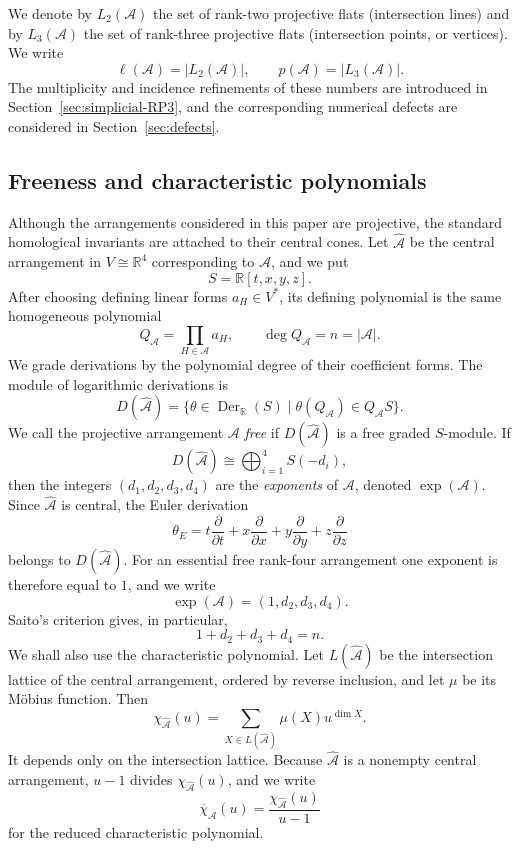 \documentclass[11pt]{article}
\theoremstyle{definition}
\theoremstyle{remark}
\newcommand{\RR}{\mathbb R}
\newcommand{\cA}{\mathcal A}
\newcommand{\card}[1]{\lvert #1\rvert}
\begin{document}
We denote by $L_2(\cA)$ the set of rank-two projective flats
(intersection lines) and by $L_3(\cA)$ the set of rank-three projective
flats (intersection points, or vertices).  We write
\[
 \ell(\cA)=\card{L_2(\cA)},
 \qquad
 p(\cA)=\card{L_3(\cA)}.
\]
The multiplicity and incidence refinements of these numbers are introduced
in Section~\ref{sec:simplicial-RP3}, and the corresponding numerical
defects are considered in Section~\ref{sec:defects}.

\subsection{Freeness and characteristic polynomials}
\label{subsec:homological}

Although the arrangements considered in this paper are projective, the
standard homological invariants are attached to their central cones.  Let
$\widehat{\cA}$ be the central arrangement in $V\cong\RR^4$ corresponding
to $\cA$, and we put
\[
 S=\RR[t,x,y,z].
\]
After choosing defining linear forms $a_H\in V^*$, its defining polynomial
is the same homogeneous polynomial
\[
 Q_{\cA}=\prod_{H\in\cA}a_H,
 \qquad \deg Q_{\cA}=n=\card{\cA}.
\]
We grade derivations by the polynomial degree of their coefficient forms.
The module of logarithmic derivations is
\[
 D(\widehat{\cA})
 =
 \bigl\{\theta\in\operatorname{Der}_{\RR}(S)
 \mid \theta(Q_{\cA})\in Q_{\cA} S\}.
\]
We call the projective arrangement $\cA$ \emph{free} if
$D(\widehat{\cA})$ is a free graded $S$-module.  If
\[
 D(\widehat{\cA})
 \cong
 \bigoplus_{i=1}^{4} S(-d_i),
\]
then the integers $(d_1,d_2,d_3,d_4)$ are the \emph{exponents} of
$\cA$, denoted $\exp(\cA)$.  Since $\widehat{\cA}$ is central, the Euler
derivation
\[
 \theta_E
 =
 t\frac{\partial}{\partial t}
 +x\frac{\partial}{\partial x}
 +y\frac{\partial}{\partial y}
 +z\frac{\partial}{\partial z}
\]
belongs to $D(\widehat{\cA})$.  For an essential free rank-four
arrangement one exponent is therefore equal to $1$, and we write
\[
 \exp(\cA)=(1,d_2,d_3,d_4).
\]
Saito's criterion \cite[Theorem~1.8(ii)]{KS1} gives, in particular,
\[
 1+d_2+d_3+d_4=n.
\]
We shall also use the characteristic polynomial.  Let
$L(\widehat{\cA})$ be the intersection lattice of the central arrangement,
ordered by reverse inclusion, and let $\mu$ be its M\"obius function.  Then
\[
 \chi_{\widehat{\cA}}(u)
 =
 \sum_{X\in L(\widehat{\cA})}\mu(X)u^{\dim X}.
\]
It depends only on the intersection lattice.  Because $\widehat{\cA}$ is a
nonempty central arrangement, $u-1$ divides
$\chi_{\widehat{\cA}}(u)$, and we write
\[
 \overline\chi_{\cA}(u)
 =
 \frac{\chi_{\widehat{\cA}}(u)}{u-1}
\]
for the reduced characteristic polynomial.
\end{document}
